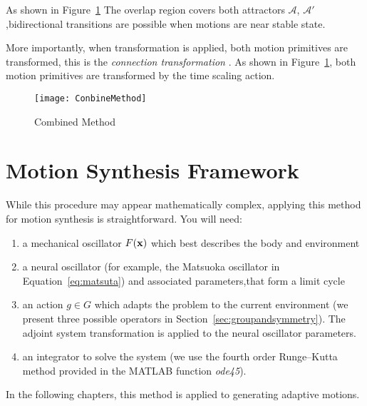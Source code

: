 As shown in Figure~\ref{fig:Combine}
The overlap region covers both attractors $\mathcal{A}$, $\mathcal{A'}$,bidirectional transitions are possible when motions are near stable state.

More importantly, when transformation is applied, both motion primitives are transformed, this is the \emph{connection transformation }. 
As shown in Figure~\ref{fig:Combine}, both motion primitives are transformed by the time scaling action.

\begin{figure}[!htbp]
  \begin{center}
      \texttt{[image: ConbineMethod]}
    \caption{Combined Method}
    \label{fig:Combine}
  \end{center}
\end{figure}

\section{Motion Synthesis Framework}
\label{sec:procframe}
While this procedure may appear mathematically complex, applying this method for motion synthesis is straightforward. 
You will need:
\begin{enumerate}
\item a mechanical oscillator $F(\mathbf{x})$ which best describes the body and environment
\item a neural oscillator (for example, the Matsuoka oscillator in Equation~\ref{eq:matsuta}) and associated parameters,that form a limit cycle

\item an action $g \in G$ which adapts the problem to the current environment (we present three possible operators in Section~\ref{sec:groupandsymmetry}). 
The adjoint system transformation  is applied to the neural oscillator parameters.

\item an integrator to solve the system (we use the fourth order Runge--Kutta method provided in the {MATLAB} function \emph{ode45}).
\end{enumerate}
In the following chapters, this method is applied to generating adaptive motions.



